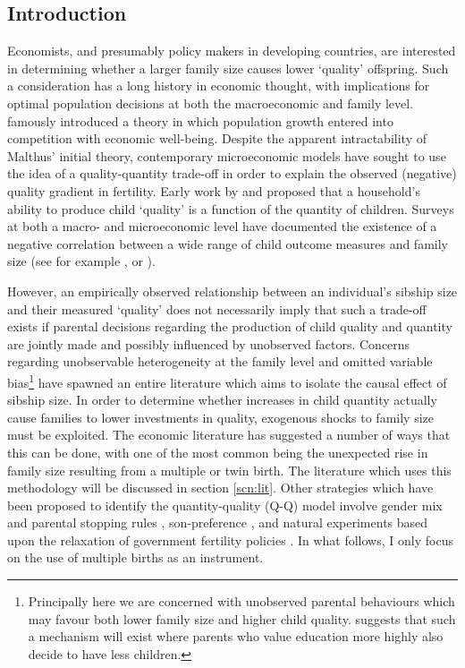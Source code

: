 \documentclass{article}[11pt,subeqn]
\begin{document}
\begin{spacing}{1.5}
\section{Introduction}
\label{scn:intro}
Economists, and presumably policy makers in developing countries, are interested in determining whether a larger family size causes lower `quality' offspring.  
Such a consideration has a long history in economic thought, with implications for optimal population decisions at both the macroeconomic and family level.  
\citet{Malthus1798} famously introduced a theory in which population growth entered into competition with economic well-being.  Despite the apparent 
intractability of Malthus' initial theory, contemporary microeconomic models have sought to use the idea of a quality-quantity trade-off in order to explain the 
observed (negative) quality gradient in fertility.  Early work by \citet{BeckerLewis1973} and \citet{BeckerTomes1976} proposed that a household's ability to 
produce child `quality' is a function of the quantity of children.  Surveys at both a macro- and microeconomic level have documented the existence of a 
negative correlation between a wide range of child outcome measures and family size (see for example \cite{Desai1995}, or \cite{Hanushek1992}).

However, an empirically observed relationship between an individual's sibship size and their measured `quality' does not necessarily imply that such a trade-off 
exists if parental decisions regarding the production of child quality and quantity are jointly made and possibly influenced by unobserved factors.  Concerns 
regarding unobservable heterogeneity at the family level and omitted variable bias\footnote{Principally here we are concerned with unobserved parental 
behaviours which may favour both lower family size and higher child quality.  \citet{Qian2009} suggests that such a mechanism will exist where parents who 
value education more highly also decide to have less children.} have spawned an entire literature which aims to isolate the causal effect of sibship size.  In 
order to determine whether increases in child quantity actually cause families to lower investments in quality, exogenous shocks to family size must be exploited.  
The economic literature has suggested a number of ways that this can be done, with one of the most common being the unexpected rise in family size resulting 
from a multiple or twin birth.  The literature which uses this methodology will be discussed in section \ref{scn:lit}.  Other strategies which have been 
proposed to identify the quantity-quality (Q-Q) model involve gender mix and parental stopping rules \citep{ConleyGlauber2006}, son-preference \citep{Lee2008}, 
and natural experiments based upon the relaxation of government fertility policies \citep{Qian2009}.   In what follows, I only focus on the use of multiple 
births as an instrument.


\end{spacing}
\end{document}
